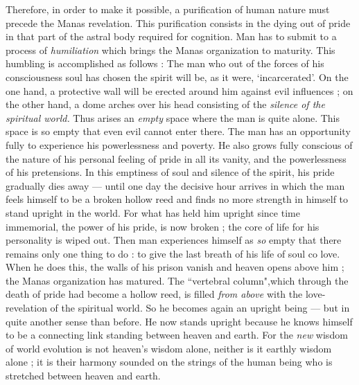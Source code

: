\begin{quotationx}
Therefore, in order to make it possible, a purification of human nature must precede the Manas revelation. This purification consists in the dying out of pride in that part of the astral body required for cognition. Man has to submit to a process of \emph{humiliation} which brings the Manas organization to maturity. This humbling is accomplished as follows : The man who out of the forces of his consciousness soul has chosen the spirit will be, as it were, `incarcerated'. On the one hand, a protective wall will be erected around him against evil influences ; on the other hand, a dome arches over his head consisting of the \emph{silence of the spiritual world.} Thus arises an \emph{empty} space where the man is quite alone. This space is so empty that even evil cannot enter there. The man has an opportunity fully to experience his powerlessness and poverty. He also grows fully conscious of the nature of his personal feeling of pride in all its vanity, and the powerlessness of his pretensions. In this emptiness of soul and silence of the spirit, his pride gradually dies away — until one day the decisive hour arrives in which the man feels himself to be a broken hollow reed and finds no more strength in himself to stand upright in the world. For what has held him upright since time immemorial, the power of his pride, is now broken ; the core of life for his personality is wiped out. Then man experiences himself as \emph{so} empty that there remains only one thing to do : to give the last breath of his life of soul co love. When he does this, the walls of his prison vanish and heaven opens above him ; the Manas organization has matured. The ``vertebral column",which through the death of pride had become a hollow reed, is filled \emph{from above} with the love-revelation of the spiritual world. So he becomes again an upright being — but in quite another sense than before. He now stands upright because he knows himself to be a connecting link standing between heaven and earth. For the \emph{new} wisdom of world evolution is not heaven's wisdom alone, neither is it earthly wisdom alone ; it is their harmony sounded on the strings of the human being who is stretched between heaven and earth.


\end{quotationx}
